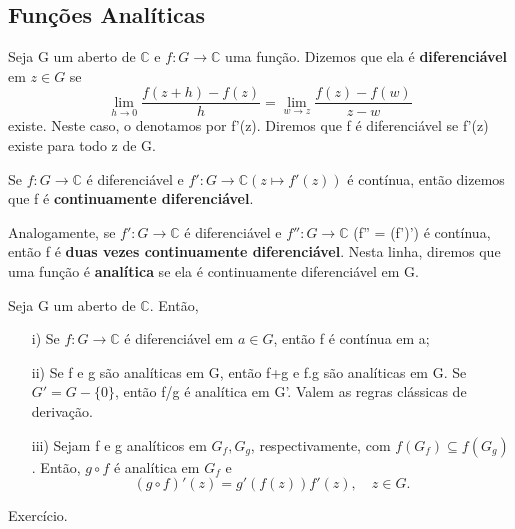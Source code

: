 \documentclass[complex.tex]{subfiles}
\begin{document}
\subsection{Funções Analíticas}
\begin{def*}
	Seja G um aberto de $\mathbb{C}$ e $f:G\rightarrow\mathbb{C}$ uma função. Dizemos que ela é \textbf{diferenciável}
	em $z\in{G}$ se
	$$
		\lim_{h\to{0}}\frac{f(z+h) - f(z)}{h} = \lim_{w\to{z}}\frac{f(z)-f(w)}{z-w}
	$$
	existe. Neste caso, o denotamos por f'(z). Diremos que f é diferenciável se f'(z) existe para todo z de G.
\end{def*}
\begin{def*}
	Se $f:G\rightarrow\mathbb{C}$ é diferenciável e $f':G\rightarrow\mathbb{C}(z\mapsto{f'(z)})$ é contínua,
	então dizemos que f é \textbf{continuamente diferenciável}.

	Analogamente, se $f':G\rightarrow\mathbb{C}$ é diferenciável e $f'':G\rightarrow\mathbb{C}$ (f'' = (f')') é
	contínua, então f é \textbf{duas vezes continuamente diferenciável}. Nesta linha, diremos que uma função é
	\textbf{analítica} se ela é continuamente diferenciável em G.
\end{def*}

\begin{prop*}
	Seja G um aberto de $\mathbb{C}$. Então,
	\begin{itemize}
		\item[i)] Se $f:G\rightarrow\mathbb{C}$ é diferenciável em $a\in{G}$, então f é contínua em a;
		\item[ii)] Se f e g são analíticas em G, então f+g e f.g são analíticas em G. Se $G' = G - \{0\}$,
		      então f/g é analítica em G'. Valem as regras clássicas de derivação.
		\item[iii)] Sejam f e g analíticos em $G_f, G_g$, respectivamente, com $f(G_f)\subseteq{f(G_g)}$. Então,
		      $g\circ f$ é analítica em $G_f$ e
		      $$
			      (g\circ f)'(z) = g'(f(z))f'(z), \quad z\in{G}.
		      $$
	\end{itemize}
\end{prop*}
\begin{proof*}
	Exercício.
	\qedsymbol
\end{proof*}
\end{document}

